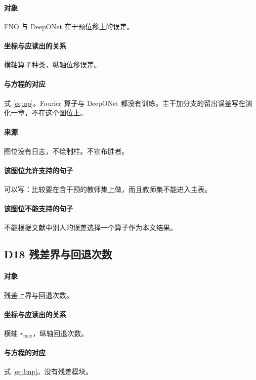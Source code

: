 \paragraph{对象}
FNO 与 DeepONet 在干预位移上的误差。

\paragraph{坐标与应读出的关系}
横轴算子种类，纵轴位移误差。

\paragraph{与方程的对应}
式 \eqref{eq:op}。Fourier 算子与 DeepONet 都没有训练。主干加分支的留出误差写在演化一章，不在这个图位上。

\paragraph{来源}
图位没有日志，不绘制柱。不宣布胜者。

\paragraph{该图位允许支持的句子}
可以写：比较要在含干预的教师集上做，而且教师集不能进入主表。

\paragraph{该图位不能支持的句子}
不能根据文献中别人的误差选择一个算子作为本文结果。

\subsection{D18 残差界与回退次数}
\paragraph{对象}
残差上界与回退次数。

\paragraph{坐标与应读出的关系}
横轴 $r_{\max}$，纵轴回退次数。

\paragraph{与方程的对应}
式 \eqref{eq:bnp}。没有残差模块。

